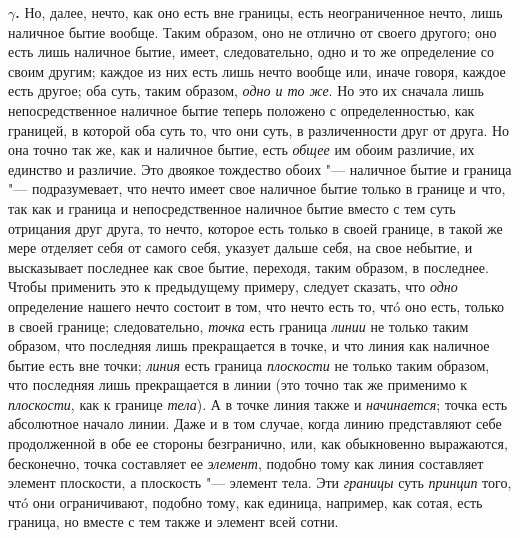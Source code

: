 \textbf{$\gamma $.} Но, далее, нечто, как оно есть вне границы, есть
неограниченное нечто, лишь наличное бытие вообще. Таким образом, оно не
отлично от своего другого; оно есть лишь наличное бытие, имеет,
следовательно, одно и то же определение со своим другим; каждое из них есть
лишь нечто вообще или, иначе говоря, каждое есть другое; оба суть, таким
образом, {\em одно и то же}. Но это их сначала лишь
непосредственное наличное бытие теперь положено с определенностью, как
границей, в которой оба суть то, что они суть, в различенности друг от
друга. Но она точно так же, как и наличное бытие, есть
{\em общее} им обоим различие, их единство и различие.
Это двоякое тождество обоих "--- наличное бытие и граница "--- подразумевает, что
нечто имеет свое наличное бытие только в границе и что, так как и граница и
непосредственное наличное бытие вместо с тем суть отрицания друг друга, то
нечто, которое есть только в своей границе, в такой же мере отделяет себя
от самого себя, указует дальше себя, на свое небытие, и высказывает
последнее как свое бытие, переходя, таким образом, в последнее. Чтобы
применить это к предыдущему примеру, следует сказать, что
{\em одно} определение нашего нечто состоит в том, что
нечто есть то, чтó оно есть, только в своей границе; следовательно,
{\em точка} есть граница
{\em линии} не только таким образом, что последняя лишь
прекращается в точке, и что линия как наличное бытие есть вне точки;
{\em линия} есть граница
{\em плоскости} не только таким образом, что последняя
лишь прекращается в линии (это точно так же применимо к
{\em плоскости}, как к границе
{\em тела}). А в точке линия также и
{\em начинается}; точка есть абсолютное начало линии.
Даже и в том случае, когда линию представляют себе продолженной в обе ее
стороны безгранично, или, как обыкновенно выражаются, бесконечно, точка
составляет ее {\em элемент}, подобно тому как линия
составляет элемент плоскости, а плоскость "--- элемент тела. Эти
{\em границы} суть {\em принцип}
того, чтó они ограничивают, подобно тому, как единица, например, как сотая,
есть граница, но вместе с тем также и элемент всей сотни.

